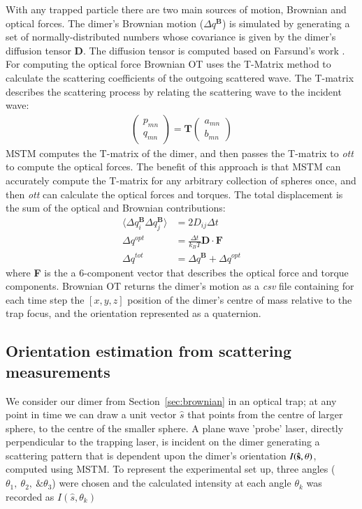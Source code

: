 \documentclass[final, 3p]{elsarticle}
\begin{document}
With any trapped particle there are two main sources of motion, Brownian and optical forces.  The dimer's Brownian motion ($\Delta q^{\textbf{B}}$) is simulated by generating a set of normally-distributed numbers whose covariance is given by the dimer's diffusion tensor $\textbf{D}$.  The diffusion tensor is computed based on Farsund's work \cite{Farsund1996}. For computing the optical force Brownian OT uses the T-Matrix method to calculate the scattering coefficients of the outgoing scattered wave.  The T-matrix describes the scattering process by relating the scattering wave to the incident wave:
\begin{align}
	\begin{pmatrix}
		p_{mn} \\
		q_{mn}
	\end{pmatrix}
	= \textbf{T}
	\begin{pmatrix}
		a_{mn} \\
		b_{mn}
	\end{pmatrix}
\end{align}
MSTM computes the T-matrix of the dimer, and then passes the T-matrix to \textit{ott} to compute the optical forces. The benefit of this approach is that MSTM can accurately compute the T-matrix for any arbitrary collection of spheres once, and then \textit{ott} can calculate the optical forces and torques. The total displacement is the sum of the optical and Brownian contributions:
\begin{align}
  \langle \Delta q_i^{\textbf{B}} \Delta q_j^{\textbf{B}}\rangle
  &= 2D_{ij} \Delta t
  \\
  \Delta q^{opt} &= \frac{\Delta t}{k_BT}\textbf{D} \cdot \textbf{F}
  \\
\Delta q^{tot} &= \Delta q^{\textbf{B}} + \Delta q^{opt}
\end{align}
where \textbf{F} is the a 6-component vector that describes the optical force and torque components.  Brownian OT returns the dimer's motion as a \textit{csv} file containing for each time step the $[x,y,z]$ position of the dimer's centre of mass relative to the trap focus, and the orientation represented as a quaternion.


\subsection{Orientation estimation from scattering measurements}
\label{sec:Bayes}

We consider our dimer from Section~\ref{sec:brownian} in an optical trap; at any point in time we can draw a unit vector $\hat{s}$ that points from the centre of larger sphere, to the centre of the smaller sphere. A plane wave 'probe' laser, directly perpendicular to the trapping laser, is incident on the dimer generating a scattering pattern that is dependent upon the dimer's orientation $I(\hat{\bf s}, \theta)$, computed using MSTM. To represent the experimental set up, three angles  ($\theta_1, \ \theta_2, \ \& \theta_3$) were chosen and the calculated intensity at each angle $\theta_k$ was recorded as $I(\hat{s}, \theta_k)$
\end{document}
